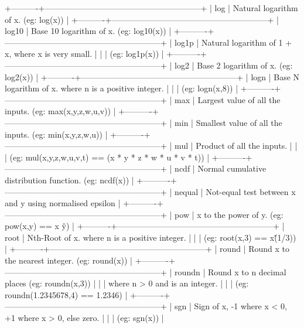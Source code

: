 +----------+---------------------------------------------------------+
| log      | Natural logarithm of x.  (eg: log(x))                   |
+----------+---------------------------------------------------------+
| log10    | Base 10 logarithm of x.  (eg: log10(x))                 |
+----------+---------------------------------------------------------+
| log1p    | Natural logarithm of 1 + x, where x is very small.      |
|          | (eg: log1p(x))                                          |
+----------+---------------------------------------------------------+
| log2     | Base 2 logarithm of x.  (eg: log2(x))                   |
+----------+---------------------------------------------------------+
| logn     | Base N logarithm of x. where n is a positive integer.   |
|          | (eg: logn(x,8))                                         |
+----------+---------------------------------------------------------+
| max      | Largest value of all the inputs. (eg: max(x,y,z,w,u,v)) |
+----------+---------------------------------------------------------+
| min      | Smallest value of all the inputs. (eg: min(x,y,z,w,u))  |
+----------+---------------------------------------------------------+
| mul      | Product of all the inputs.                              |
|          | (eg: mul(x,y,z,w,u,v,t) == (x * y * z * w * u * v * t)) |
+----------+---------------------------------------------------------+
| ncdf     | Normal cumulative distribution function.  (eg: ncdf(x)) |
+----------+---------------------------------------------------------+
| nequal   | Not-equal test between x and y using normalised epsilon |
+----------+---------------------------------------------------------+
| pow      | x to the power of y.  (eg: pow(x,y) == x \^ y)           |
+----------+---------------------------------------------------------+
| root     | Nth-Root of x. where n is a positive integer.           |
|          | (eg: root(x,3) == x\^(1/3))                              |
+----------+---------------------------------------------------------+
| round    | Round x to the nearest integer.  (eg: round(x))         |
+----------+---------------------------------------------------------+
| roundn   | Round x to n decimal places  (eg: roundn(x,3))          |
|          | where n > 0 and is an integer.                          |
|          | (eg: roundn(1.2345678,4) == 1.2346)                     |
+----------+---------------------------------------------------------+
| sgn      | Sign of x, -1 where x < 0, +1 where x > 0, else zero.   |
|          | (eg: sgn(x))                                            |
